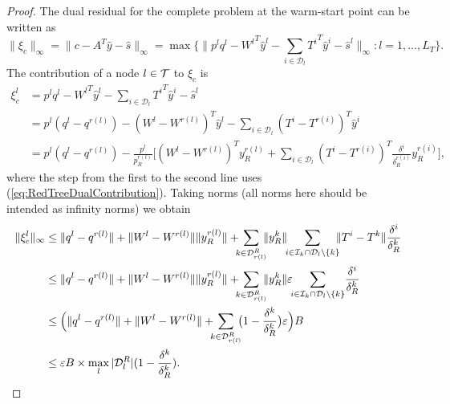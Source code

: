 \begin{proof}
The dual residual for the complete problem at the warm-start point 
can be written as
\[
  \|\xi_c\|_\infty = \|c -A^T\hat y -\hat s \|_\infty 
                   = \max\{\|p^{l}q^{l}
                   - {W^{l}}^T\hat y^{l} 
                   - \sum_{i \in \mathcal{D}_{l}} {T^{i}}^T\hat y^{i}
                   - \hat s^{l}
  \|_\infty : l = 1,\ldots,L_T\}.
\]
%
The contribution of a node $l \in \mathcal{T}$ to $\xi_c$ is
\[
\begin{split}
  \xi_c^{l} 
 & = p^{l} q^{l} - {W^{l}}^T\hat y^{l}
     - \sum_{i\in \mathcal{D}_{l}} {T^i}^T \!\hat y^{i} -\hat s^{l} \\
 & = p^{l}(q^{l}\!-\! q^{r(l)})
     - (W^{l} \!-\! W^{r(l)})^T \hat y^{l}
     -\sum_{i \in \mathcal{D}_{l}} (T^{i} \!-\! T^{r(i)})^T\hat y^i \\
 & = p^{l}(q^{l} \!-\! q^{r(l)})
     - \frac{p^{l}}{p^{r(l)}_R} \Big[
       (W^{l} \!-\! W^{r(l)})^T y^{r(l)}_R
       +\sum_{i\in \mathcal{D}_{l}} %
           (T^{i} \!-\! T^{r(i)})^T 
           \frac{\delta^i}{\delta^{r(i)}_R} y^{r(i)}_R \Big],
\end{split}
\]
where the step from the first to the second line uses 
(\ref{eq:RedTreeDualContribution}).
%
Taking norms (all norms here should be intended as infinity norms)
we obtain
\[
\begin{split}
  \| \xi_c^{l} \|_\infty
  & \le \|q^{l} - q^{r(l)}\| 
        + \|W^{l} - W^{r(l)}\| \| y^{r(l)}_R\|
        + \!\!\! \sum_{k\in \mathcal{D}_{r(l)}^R} \!\!\! \| y^{k}_R \| \!\!
          \sum_{i\in \mathcal{I}_k \cap \mathcal{D}_{l}\setminus \{k\} }
	  \!\!\! \| T^{i} - T^{k} \| \frac{\delta^i}{\delta_R^k} \\
  & \le \|q^{l} - q^{r(l)}\| 
        + \|W^{l} - W^{r(l)}\| \| y^{r(l)}_R\|
        + \!\!\! \sum_{k\in \mathcal{D}_{r(l)}^R} \!\!\! \| y^{k}_R \|
          \varepsilon \!\!
          \sum_{i\in \mathcal{I}_k \cap \mathcal{D}_{l}\setminus \{k\} }
	  \! \frac{\delta^i}{\delta_R^k} \\
  & \le \Big( \|q^{l} - q^{r(l)}\| 
        + \|W^{l} - W^{r(l)}\|
        + \!\!\! \sum_{k\in \mathcal{D}_{r(l)}^R} \!\!\!
	  \big( 1 - \frac{\delta^k}{\delta_R^k} \big) \varepsilon \Big) B \\
  & \le \varepsilon B\times 
        \max_{l} |\mathcal{D}_{l}^R| (1 - \frac{\delta^k}{\delta^k_R}).
        \qedhere
\end{split}
\]
%
\end{proof}

